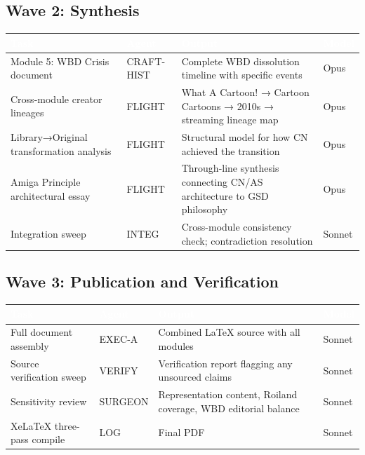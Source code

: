 \documentclass[11pt,letterpaper]{article}
\newcommand{\tableheader}[1]{\textbf{\sffamily\textcolor{white}{#1}}}
\begin{document}
\subsection{Wave 2: Synthesis}

\begin{center}
\begin{tabularx}{\textwidth}{L{3.5cm}L{2.5cm}XL{2.5cm}}
\toprule
{}
\tableheader{Task} & \tableheader{Agent} & \tableheader{Output} & \tableheader{Model} \\
\midrule
Module 5: WBD Crisis document & CRAFT-HIST & Complete WBD dissolution timeline with specific events & Opus \\
Cross-module creator lineages & FLIGHT & What A Cartoon! → Cartoon Cartoons → 2010s → streaming lineage map & Opus \\
Library→Original transformation analysis & FLIGHT & Structural model for how CN achieved the transition & Opus \\
Amiga Principle architectural essay & FLIGHT & Through-line synthesis connecting CN/AS architecture to GSD philosophy & Opus \\
Integration sweep & INTEG & Cross-module consistency check; contradiction resolution & Sonnet \\
\bottomrule
\end{tabularx}
\end{center}

\subsection{Wave 3: Publication and Verification}

\begin{center}
\begin{tabularx}{\textwidth}{L{3.5cm}L{2.5cm}XL{2.5cm}}
\toprule
{}
\tableheader{Task} & \tableheader{Agent} & \tableheader{Output} & \tableheader{Model} \\
\midrule
Full document assembly & EXEC-A & Combined LaTeX source with all modules & Sonnet \\
Source verification sweep & VERIFY & Verification report flagging any unsourced claims & Sonnet \\
Sensitivity review & SURGEON & Representation content, Roiland coverage, WBD editorial balance & Sonnet \\
XeLaTeX three-pass compile & LOG & Final PDF & Sonnet \\
\bottomrule
\end{tabularx}
\end{center}
\end{document}

